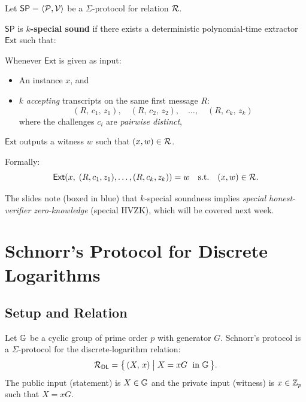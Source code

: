 \documentclass[11pt]{article}
\begin{document}
\begin{tcolorbox}[colback=green!5!white, colframe=green!60!black,
                  title={Definition: $k$-Special Soundness ($k$-SS)}]
Let $\mathsf{SP} = \langle \mathcal{P}, \mathcal{V} \rangle$ be a $\Sigma$-protocol for relation $\mathcal{R}$.

$\mathsf{SP}$ is \textbf{$k$-special sound} if there exists a deterministic polynomial-time extractor $\mathsf{Ext}$ such that:

Whenever $\mathsf{Ext}$ is given as input:
\begin{itemize}
  \item An instance $x$, and
  \item $k$ \emph{accepting} transcripts on the same first message $R$:
    \[
      (R,\, c_1,\, z_1),\quad (R,\, c_2,\, z_2),\quad \ldots,\quad (R,\, c_k,\, z_k)
    \]
    where the challenges $c_i$ are \emph{pairwise distinct},
\end{itemize}
$\mathsf{Ext}$ outputs a witness $w$ such that $(x, w) \in \mathcal{R}$.

Formally:
\[
  \mathsf{Ext}\!\left(x,\; (R,c_1,z_1), \ldots, (R,c_k,z_k)\right) = w
  \quad \text{s.t.} \quad (x,w) \in \mathcal{R}.
\]
\end{tcolorbox}

\begin{remark}
The slides note (boxed in blue) that $k$-special soundness implies \emph{special honest-verifier zero-knowledge} (special HVZK), which will be covered next week.
\end{remark}

\section{Schnorr's Protocol for Discrete Logarithms}

\subsection{Setup and Relation}

Let $\mathbb{G}$ be a cyclic group of prime order $p$ with generator $G$. Schnorr's protocol is a $\Sigma$-protocol for the discrete-logarithm relation:
\[
  \mathcal{R}_{\mathsf{DL}} = \bigl\{\,(X,\, x) \;\big|\; X = xG \;\text{ in } \mathbb{G}\,\bigr\}.
\]
The public input (statement) is $X \in \mathbb{G}$ and the private input (witness) is $x \in \mathbb{Z}_p$ such that $X = xG$.
\end{document}
